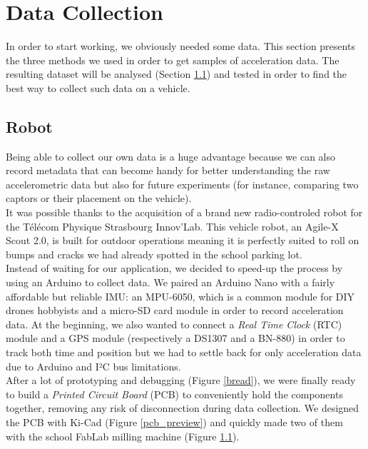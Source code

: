 \section{Data Collection}

In order to start working, we obviously needed some data. This section presents the three methods we used in order to get samples of acceleration data. The resulting dataset will be analysed (Section \ref{}) and tested in order to find the best way to collect such data on a vehicle.

\subsection{Robot}
Being able to collect our own data is a huge advantage because we can also record metadata that can become handy for better understanding the raw accelerometric data but also for future experiments (for instance, comparing two captors or their placement on the vehicle).\\

It was possible thanks to the acquisition of a brand new radio-controled robot for the Télécom Physique Strasbourg Innov'Lab. This vehicle robot, an Agile-X Scout 2.0, is built for outdoor operations meaning it is perfectly suited to roll on bumps and cracks we had already spotted in the school parking lot.\\

Instead of waiting for our application, we decided to speed-up the process by using an Arduino to collect data. We paired an Arduino Nano with a fairly affordable but reliable IMU: an MPU-6050, which is a common module for DIY drones hobbyists and a micro-SD card module in order to record acceleration data. At the beginning, we also wanted to connect a \textit{Real Time Clock} (RTC) module and a GPS module (respectively a DS1307 and a BN-880) in order to track both time and position but we had to settle back for only acceleration data due to Arduino and I²C bus limitations.\\

After a lot of prototyping and debugging (Figure \ref{bread}), we were finally ready to build a \textit{Printed Circuit Board} (PCB) to conveniently hold the components together, removing any risk of disconnection during data collection. We designed the PCB with Ki-Cad (Figure \ref{pcb_preview}) and quickly made two of them with the school FabLab milling machine (Figure \ref{}).\\

